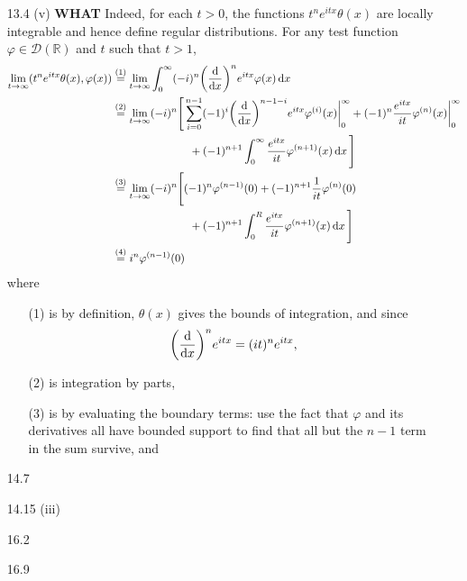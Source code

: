 \documentclass[11pt]{article}
\newcommand{\eq}[1]{\overset{(#1)}{=}}
\begin{document}
\begin{enumerate}
    \hrulefill

    \item[13.4](v) \textbf{WHAT} Indeed, for each $t>0$, the functions $t^ne^{itx}\theta(x)$ are locally integrable and hence define regular distributions. For any test function $\varphi\in \mathcal{D}(\mathbb{R})$ and $t$ such that $t>1$, \begin{align*}
        \lim_{t\to\infty}(t^ne^{itx}\theta(x),\varphi(x)) &\eq{1} \lim_{t\to\infty}\int_0^\infty (-i)^n\biggl(\dv{x}\biggr)^ne^{itx} \varphi(x)\dd{x}\\
        &\eq{2} \lim_{t\to\infty}(-i)^n\Bigg[\sum_{i=0}^{n-1}(-1)^i\biggl(\dv{x}\biggr)^{n-1-i}e^{itx}\varphi^{(i)}(x)\bigg|_0^\infty + (-1)^n\frac{e^{itx}}{it}\varphi^{(n)}(x)\bigg|_0^\infty \\&\hspace{7em} + (-1)^{n+1}\int_0^\infty \frac{e^{itx}}{it}\varphi^{(n+1)}(x)\dd{x}\Bigg]\\
        &\eq{3} \lim_{t\to\infty}(-i)^n\Bigg[(-1)^{n}\varphi^{(n-1)}(0) + (-1)^{n+1}\frac{1}{it}\varphi^{(n)}(0) \\&\hspace{7em} + (-1)^{n+1}\int_0^R \frac{e^{itx}}{it}\varphi^{(n+1)}(x)\dd{x}\Bigg]\\
        &\eq{4} i^n\varphi^{(n-1)}(0)
    \end{align*} where \begin{enumerate}
        \item[(1)] is by definition, $\theta(x)$ gives the bounds of integration, and since \[\biggl(\dv{x}\biggr)^ne^{itx} = (it)^ne^{itx},\]
        \item[(2)] is integration by parts, 
        \item[(3)] is by evaluating the boundary terms: use the fact that $\varphi$ and its derivatives all have bounded support to find that all but the $n-1$ term in the sum survive, and  
    \end{enumerate}

    \hrulefill

    \item[14.7]

    \hrulefill

    \item[14.15](iii)

    \hrulefill

    \item[16.2]

    \hrulefill

    \item[16.9]


\end{enumerate}
\end{document}
